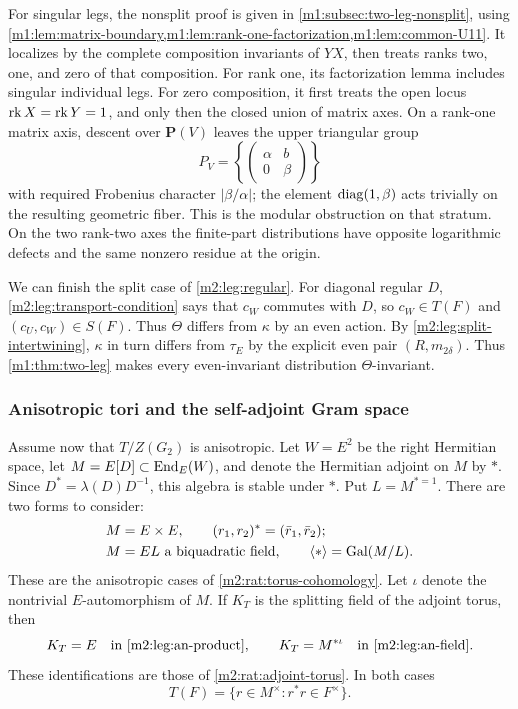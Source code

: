 For singular legs, the nonsplit proof is given in \cref{m1:subsec:two-leg-nonsplit}, using
\cref{m1:lem:matrix-boundary,m1:lem:rank-one-factorization,m1:lem:common-U11}. It localizes by the complete composition invariants
of $YX$, then treats ranks two, one, and zero of that composition.
For rank one, its factorization lemma includes singular individual
legs. For zero composition, it first treats the open locus
$\operatorname{rk} X=\operatorname{rk} Y=1$, and only then the closed union of matrix axes.
On a rank-one matrix axis, descent over $\mathbf P(V)$ leaves the
upper triangular group
\[
 P_V=\left\{\begin{pmatrix}\alpha&b\\0&\beta\end{pmatrix}\right\}
\]
with required Frobenius character $|\beta/\alpha|$; the element
$\operatorname{diag}(1,\beta)$ acts trivially on the resulting geometric fiber.
This is the modular obstruction on that stratum. On the two rank-two
axes the finite-part distributions have opposite logarithmic defects
and the same nonzero residue at the origin. 

We can finish the split case of \cref{m2:leg:regular}. For diagonal
regular $D$, \eqref{m2:leg:transport-condition} says that $c_W$ commutes
with $D$, so $c_W\in T(F)$ and $(c_U,c_W)\in S(F)$.
Thus $\Theta$ differs from $\kappa$ by an even action. By
\cref{m2:leg:split-intertwining}, $\kappa$ in turn differs from
$\tau_E$ by the explicit even pair $(R,m_{2\delta})$.
Thus \cref{m1:thm:two-leg} makes every even-invariant distribution
$\Theta$-invariant.

\subsubsection{Anisotropic tori and the self-adjoint Gram space}

Assume now that $T/Z(G_2)$ is anisotropic. Let $W=E^2$ be the right
Hermitian space, let $M=E[D]\subset\operatorname{End}_E(W)$, and denote the
Hermitian adjoint on $M$ by $*$. Since
$D^*=\lambda(D)D^{-1}$, this algebra is stable under $*$.
Put $L=M^{*=1}$. There are two forms to consider:
\begin{align}
 &M=E\times E,\qquad
   (r_1,r_2)^*=(\bar r_1,\bar r_2);\label{m2:leg:an-product}\\
 &M=EL\text{ a biquadratic field},\qquad
   \langle *\rangle=\operatorname{Gal}(M/L).\label{m2:leg:an-field}
\end{align}
These are the anisotropic cases of \cref{m2:rat:torus-cohomology}.
Let $\iota$ denote the nontrivial $E$-automorphism of $M$.
If $K_T$ is the splitting field of the adjoint torus, then
\begin{equation}\label{m2:leg:splitting-field}
 K_T=E\quad\hbox{in \eqref{m2:leg:an-product}},\qquad
 K_T=M^{*\iota}\quad\hbox{in \eqref{m2:leg:an-field}}.
\end{equation}
These identifications are those of \cref{m2:rat:adjoint-torus}.
In both cases
\[
 T(F)=\{r\in M^\times:r^*r\in F^\times\}.
\]

